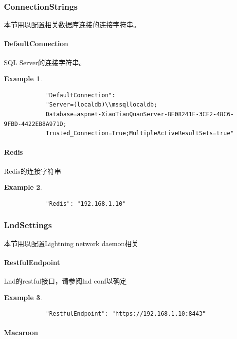 \documentclass[a4paper,11pt]{article}
\theoremstyle{definition}
\newtheorem{exmp}{Example}[section]
\begin{document}
\subsubsection{ConnectionStrings}

本节用以配置相关数据库连接的连接字符串。

\paragraph{DefaultConnection}


SQL Server的连接字符串。
    \begin{exmp}
        \begin{lstlisting}
            "DefaultConnection":
            "Server=(localdb)\\mssqllocaldb;
            Database=aspnet-XiaoTianQuanServer-BE08241E-3CF2-48C6-9FBD-4422EB8A971D;
            Trusted_Connection=True;MultipleActiveResultSets=true"
        \end{lstlisting}
    \end{exmp}

\paragraph{Redis}


Redis的连接字符串
    \begin{exmp}
        \begin{lstlisting}
            "Redis": "192.168.1.10"
        \end{lstlisting}
    \end{exmp}

\subsubsection{LndSettings}
本节用以配置Lightning network daemon相关

\paragraph{RestfulEndpoint}


Lnd的restful接口，请参阅lnd conf以确定
    \begin{exmp}
        \begin{lstlisting}
            "RestfulEndpoint": "https://192.168.1.10:8443"
        \end{lstlisting}
    \end{exmp}

\paragraph{Macaroon}
\end{document}
